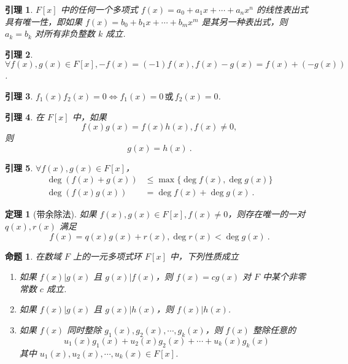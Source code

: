 \documentclass[zihao=-4,UTF8,linespread=1.8,nothm]{aytony_base}
\newtheorem{theorem}{\indent 定理}[subsection]
\newtheorem{lemma}{\indent 引理}[subsection]
\newtheorem{proposition}{\indent 命题}[subsection]
\begin{document}
\begin{lemma}
    $F[x]$ 中的任何一个多项式 $f(x) = a_0 + a_1x + \cdots + a_nx^n$ 的线性表出式具有唯一性，即如果 $f(x) = b_0 + b_1x + \cdots + b_mx^m$ 是其另一种表出式，则 $a_k = b_k$ 对所有非负整数 $k$ 成立.
\end{lemma}

\begin{lemma}
    $\forall f(x), g(x) \in F[x], -f(x) = (-1)f(x), f(x) - g(x) = f(x) + (-g(x))$.
\end{lemma}

\begin{lemma}
    $f_1(x)f_2(x) = 0 \Leftrightarrow f_1(x) = 0\, \text{或}\, f_2(x) = 0$.
\end{lemma}

\begin{lemma}
    在 $F[x]$ 中，如果 $$
        f(x)g(x) = f(x)h(x), f(x) \neq 0,
    $$ 则 $$
        g(x) = h(x)\ .
    $$
\end{lemma}

\begin{lemma}
    $\forall f(x), g(x) \in F[x]$，$$
        \begin{aligned}
            \deg(f(x) + g(x)) & \leqslant \max\{\deg f(x), \deg g(x)\} \\
            \deg(f(x)g(x))    & = \deg f(x) + \deg g(x)\ .
        \end{aligned}$$
\end{lemma}

\begin{theorem}[带余除法]
    如果 $f(x), g(x) \in F[x], f(x) \neq 0$，则存在唯一的一对 $q(x), r(x)$ 满足 $$
        f(x) = q(x)g(x) + r(x), \deg r(x) < \deg g(x)\ .
    $$
\end{theorem}

\begin{proposition}
    在数域 $F$ 上的一元多项式环 $F[x]$ 中，下列性质成立
    \begin{enumerate}[nosep]
        \item 如果 $f(x) | g(x)$ 且 $g(x) | f(x)$，则 $f(x) = cg(x)$ 对 $F$ 中某个非零常数 $c$ 成立.
        \item 如果 $f(x) | g(x)$ 且 $g(x) | h(x)$，则 $f(x) | h(x)$.
        \item 如果 $f(x)$ 同时整除 $g_1(x), g_2(x), \cdots, g_k(x)$，则 $f(x)$ 整除任意的 $$
                  u_1(x)g_1(x) + u_2(x)g_2(x)+ \cdots + u_k(x)g_k(x)
              $$ 其中 $u_1(x), u_2(x), \cdots, u_k(x) \in F[x]$.
    \end{enumerate}
\end{proposition}
\end{document}
